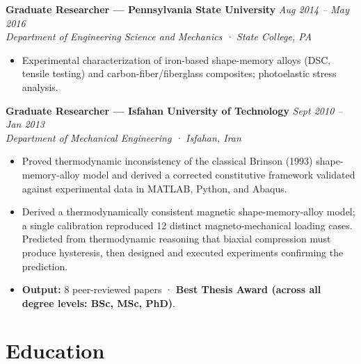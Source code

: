\documentclass[10pt, letterpaper]{article}
\newcommand{\jobheader}[2]{%
  \noindent
  \textbf{\color{darkgray}#1}
  \hfill
  {\color{midgray}\textit{#2}}
  \\[-2pt]
}
\newcommand{\subline}[1]{%
  \noindent
  {\color{midgray}\textit{#1}}
  \par\vspace{2pt}
}
\begin{document}
\jobheader
{Graduate Researcher --- Pennsylvania State University}
{Aug 2014 -- May 2016}

\subline
{Department of Engineering Science and Mechanics · State College, PA}

\begin{itemize}

\item Experimental characterization of iron-based shape-memory alloys
(DSC, tensile testing) and carbon-fiber/fiberglass composites; photoelastic
stress analysis.

\end{itemize}


\jobheader
{Graduate Researcher --- Isfahan University of Technology}
{Sept 2010 -- Jan 2013}

\subline
{Department of Mechanical Engineering · Isfahan, Iran}

\begin{itemize}

\item Proved thermodynamic inconsistency of the classical Brinson (1993)
shape-memory-alloy model and derived a corrected constitutive framework
validated against experimental data in MATLAB, Python, and Abaqus.

\item Derived a thermodynamically consistent magnetic shape-memory-alloy model;
a single calibration reproduced 12 distinct magneto-mechanical loading cases.
Predicted from thermodynamic reasoning that biaxial compression must produce
hysteresis, then designed and executed experiments confirming the prediction.

\item \textbf{Output:}
8 peer-reviewed papers ·
\textbf{Best Thesis Award (across all degree levels: BSc, MSc, PhD)}.

\end{itemize}



\section{Education}
\end{document}
